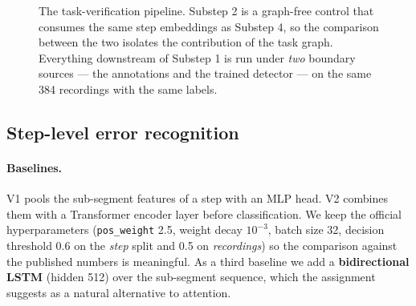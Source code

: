 \documentclass[10pt,twocolumn,letterpaper]{article}
\begin{document}
\begin{figure}[t]
\centering
{}
\caption{The task-verification pipeline. Substep 2 is a graph-free control that
consumes the same step embeddings as Substep 4, so the comparison between the two
isolates the contribution of the task graph. Everything downstream of
Substep 1 is run under \emph{two} boundary sources --- the annotations and the
trained detector --- on the same 384 recordings with the same labels.}
\label{fig:pipeline}
\end{figure}

\subsection{Step-level error recognition}

\paragraph{Baselines.} V1 pools the sub-segment features of a step with an MLP
head. V2 combines them with a Transformer encoder layer before classification. We
keep the official hyperparameters (\texttt{pos\_weight} 2.5, weight decay
$10^{-3}$, batch size 32, decision threshold 0.6 on the \emph{step} split and 0.5
on \emph{recordings}) so the comparison against the published numbers is
meaningful. As a third baseline we add a \textbf{bidirectional LSTM} (hidden 512)
over the sub-segment sequence, which the assignment suggests as a natural
alternative to attention.
\end{document}
